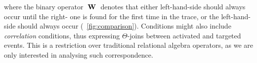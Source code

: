 where the binary operator ${}\;\mathbf{W}\;{}$ denotes that either left-hand-side should always occur until the right- one is found for the first time in the trace, or the left-hand-side should always occur (\figurename~\ref{fig:comparison}). %
Conditions might %
also include %
\textit{correlation} conditions, thus expressing $\Theta$-joins between activated and targeted events. %
This is a restriction over traditional relational algebra operators, as we are only interested in analysing such correspondence. %



